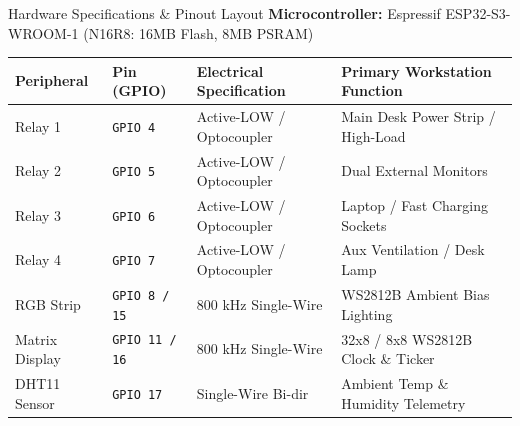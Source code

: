 \documentclass[aspectratio=169, 10pt]{beamer}
\begin{document}
\begin{frame}{Hardware Specifications \& Pinout Layout}
    \textbf{Microcontroller:} Espressif ESP32-S3-WROOM-1 (N16R8: 16MB Flash, 8MB PSRAM)
    \vspace{0.2cm}
    \begin{table}
        \centering
        \small
        \begin{tabular}{@{}llll@{}}
            \toprule
            \textbf{Peripheral} & \textbf{Pin (GPIO)} & \textbf{Electrical Specification} & \textbf{Primary Workstation Function} \\
            \midrule
            Relay 1 & \texttt{GPIO 4} & Active-LOW / Optocoupler & Main Desk Power Strip / High-Load \\
            Relay 2 & \texttt{GPIO 5} & Active-LOW / Optocoupler & Dual External Monitors \\
            Relay 3 & \texttt{GPIO 6} & Active-LOW / Optocoupler & Laptop / Fast Charging Sockets \\
            Relay 4 & \texttt{GPIO 7} & Active-LOW / Optocoupler & Aux Ventilation / Desk Lamp \\
            RGB Strip & \texttt{GPIO 8 / 15} & 800 kHz Single-Wire & WS2812B Ambient Bias Lighting \\
            Matrix Display & \texttt{GPIO 11 / 16} & 800 kHz Single-Wire & 32x8 / 8x8 WS2812B Clock \& Ticker \\
            DHT11 Sensor & \texttt{GPIO 17} & Single-Wire Bi-dir & Ambient Temp \& Humidity Telemetry \\
            \bottomrule
        \end{tabular}
    \end{table}
\end{frame}
\end{document}

